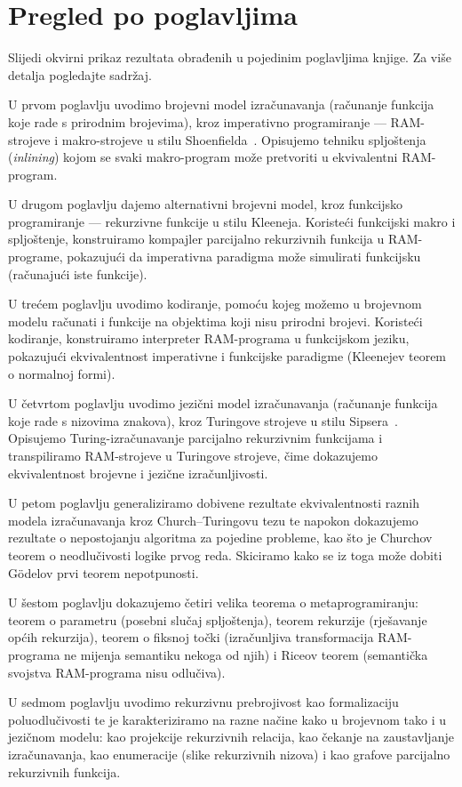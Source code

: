 \section[]{Pregled po poglavljima}
Slijedi okvirni prikaz rezultata obrađenih u pojedinim poglavljima knjige. Za više detalja pogledajte sadržaj.

U prvom poglavlju uvodimo brojevni model izračunavanja (računanje funkcija koje rade s prirodnim brojevima), kroz imperativno programiranje --- RAM-strojeve i makro-strojeve u stilu Shoenfielda~\cite{shoenfield}. Opisujemo tehniku spljoštenja (\emph{inlining}) kojom se svaki makro-program može pretvoriti u ekvivalentni RAM-program.

U drugom poglavlju dajemo alternativni brojevni model, kroz funkcijsko programiranje --- rekurzivne funkcije u stilu Kleeneja. Koristeći funkcijski makro i spljoštenje, konstruiramo kompajler parcijalno rekurzivnih funkcija u RAM-programe, pokazujući da imperativna paradigma može simulirati funkcijsku (računajući iste funkcije).

U trećem poglavlju uvodimo kodiranje, pomoću kojeg možemo u brojevnom modelu računati i funkcije na objektima koji nisu prirodni brojevi. Koristeći kodiranje, konstruiramo interpreter RAM-programa u funkcijskom jeziku, pokazujući ekvivalentnost imperativne i funkcijske paradigme (Kleenejev teorem o normalnoj formi).

U četvrtom poglavlju uvodimo jezični model izračunavanja (računanje funkcija koje rade s nizovima znakova), kroz Turingove strojeve u stilu Sipsera~\cite{sipser}. Opisujemo Turing-izračunavanje parcijalno rekurzivnim funkcijama i transpiliramo RAM-strojeve u Turingove strojeve, čime dokazujemo ekvivalentnost brojevne i jezične izračunljivosti.

U petom poglavlju generaliziramo dobivene rezultate ekvivalentnosti raznih modela izračunavanja kroz Church--\!Turingovu tezu te napokon dokazujemo rezultate o nepostojanju algoritma za pojedine probleme, kao što je Churchov teorem o neodlučivosti logike prvog reda. Skiciramo kako se iz toga može dobiti G\"odelov prvi teorem nepotpunosti.

U šestom poglavlju dokazujemo četiri velika teorema o metaprogramiranju: teorem o parametru (posebni slučaj spljoštenja), teorem rekurzije (rješavanje općih rekurzija), teorem o fiksnoj točki (izračunljiva transformacija RAM-programa ne mijenja semantiku nekoga od njih) i Riceov teorem (semantička svojstva RAM-programa nisu odlučiva).

U sedmom poglavlju uvodimo rekurzivnu prebrojivost kao formalizaciju poluodlučivosti te je karakteriziramo na razne načine kako u brojevnom tako i u jezičnom modelu: kao projekcije rekurzivnih relacija, kao čekanje na zaustavljanje izračunavanja, kao enumeracije (slike rekurzivnih nizova) i kao grafove parcijalno rekurzivnih funkcija.

